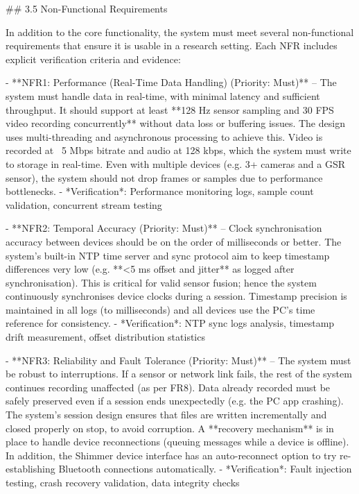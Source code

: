 \documentclass[12pt,a4paper]{article}
\begin{document}
## 3.5 Non-Functional Requirements

In addition to the core functionality, the system must meet several non-functional requirements that ensure it is usable in a research setting. Each NFR includes explicit verification criteria and evidence:

- **NFR1: Performance (Real-Time Data Handling) (Priority: Must)** -- The system must handle data in real-time, with minimal latency and sufficient throughput. It should support at least **128 Hz sensor sampling and 30 FPS video recording concurrently** without data loss or buffering issues. The design uses multi-threading and asynchronous processing to achieve this. Video is recorded at ~5 Mbps bitrate and audio at 128 kbps, which the system must write to storage in real-time. Even with multiple devices (e.g. 3+ cameras and a GSR sensor), the system should not drop frames or samples due to performance bottlenecks.
  - *Verification*: Performance monitoring logs, sample count validation, concurrent stream testing

- **NFR2: Temporal Accuracy (Priority: Must)** -- Clock synchronisation accuracy between devices should be on the order of milliseconds or better. The system's built-in NTP time server and sync protocol aim to keep timestamp differences very low (e.g. **<5 ms offset and jitter** as logged after synchronisation). This is critical for valid sensor fusion; hence the system continuously synchronises device clocks during a session. Timestamp precision is maintained in all logs (to milliseconds) and all devices use the PC's time reference for consistency.
  - *Verification*: NTP sync logs analysis, timestamp drift measurement, offset distribution statistics

- **NFR3: Reliability and Fault Tolerance (Priority: Must)** -- The system must be robust to interruptions. If a sensor or network link fails, the rest of the system continues recording unaffected (as per FR8). Data already recorded must be safely preserved even if a session ends unexpectedly (e.g. the PC app crashing). The system's session design ensures that files are written incrementally and closed properly on stop, to avoid corruption. A **recovery mechanism** is in place to handle device reconnections (queuing messages while a device is offline). In addition, the Shimmer device interface has an auto-reconnect option to try re-establishing Bluetooth connections automatically.
  - *Verification*: Fault injection testing, crash recovery validation, data integrity checks
\end{document}
